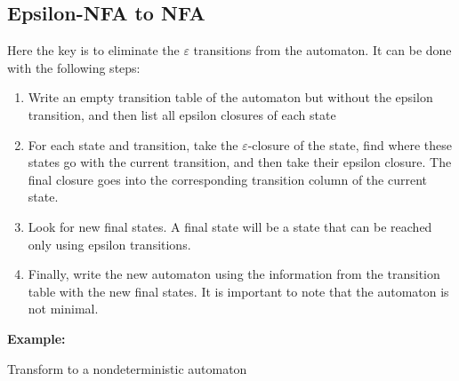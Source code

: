 \subsection{Epsilon-NFA to NFA}

Here the key is to eliminate the \(\varepsilon\) transitions from the automaton. It can be done 
with the following steps:

\begin{enumerate}
     
    \item Write an empty transition table of the automaton but without the epsilon transition, and then 
          list all epsilon closures of each state
   
    \item For each state and transition, take the \(\varepsilon\)-closure of the state, find where
          these states go with the current transition, and then take their epsilon closure. The final closure
          goes into the corresponding transition column of the current state.
    
    \item Look for new final states. A final state will be a state that can be reached only using epsilon 
          transitions.
    
    \item Finally, write the new automaton using the information from the transition table with the new 
          final states. It is important to note that the automaton is not minimal. 

\end{enumerate}

\textbf{Example:}

Transform to a nondeterministic automaton 

\begin{center}
\end{center}


